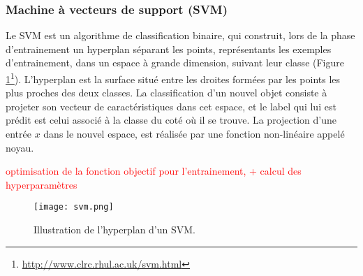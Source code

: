 
\subsubsection{Machine à vecteurs de support (SVM)}
Le SVM \citep{vapnik1995statlearning} est un algorithme de classification binaire, qui construit, lors de la phase d'entrainement un hyperplan séparant les points, représentants les exemples d'entrainement, dans un espace à grande dimension, suivant leur classe (Figure \ref{fig:sensresultat:svm}\footnote{\url{http://www.clrc.rhul.ac.uk/svm.html}}). L'hyperplan est la surface situé entre les droites formées par les points les plus proches des deux classes. La classification d'un nouvel objet consiste à projeter son vecteur de caractéristiques dans cet espace, et le label qui lui est prédit est celui associé à la classe du coté où il se trouve. La projection d'une entrée $x$ dans le nouvel espace, est réalisée par une fonction non-linéaire appelé noyau.

\textcolor{red}{optimisation de la fonction objectif pour l'entrainement, + calcul des hyperparamètres}

\begin{figure}[!htb]
	\centering
	\texttt{[image: svm.png]}
	\caption{Illustration de l'hyperplan d'un SVM.}\label{fig:sensresultat:svm}
\end{figure}

